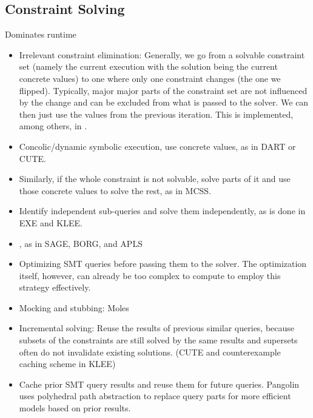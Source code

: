 \documentclass{article}
\begin{document}
\begin{multicols}{2}
    \subsection{Constraint Solving}
    \label{ConstraintSolving}
    Dominates runtime
    \begin{itemize}
        \item Irrelevant constraint elimination: Generally, we go from a solvable constraint set (namely the current execution with the solution being the current concrete values) to one where only one constraint changes (the one we flipped). Typically, major major parts of the constraint set are not influenced by the change and can be excluded from what is passed to the solver. We can then just use the values from the previous iteration. This is implemented, among others, in \cite{SAGE}.
        \item Concolic/dynamic symbolic execution, use concrete values, as in DART\cite{DART} or CUTE\cite{CUTE}.
        \item Similarly, if the whole constraint is not solvable, solve parts of it and use those concrete values to solve the rest, as in MCSS\cite{MCSS}.
        \item Identify independent sub-queries and solve them independently, as is done in EXE\cite{EXE} and KLEE\cite{KLEE}.
        \item {}\cite{Science}, as in SAGE\cite{SAGE}, BORG\cite{BORG}, and APLS\cite{APLS}
        \item Optimizing SMT queries before passing them to the solver. The optimization itself, however, can already be too complex to compute to employ this strategy effectively.
        \item Mocking and stubbing: Moles\cite{Moles}
        \item Incremental solving: Reuse the results of previous similar queries, because subsets of the constraints are still solved by the same results and supersets often do not invalidate existing solutions. (CUTE\cite{CUTE} and counterexample caching scheme in KLEE\cite{KLEE})
        \item Cache prior SMT query results and reuse them for future queries. Pangolin\cite{Pangolin} uses polyhedral path abstraction to replace query parts for more efficient models based on prior results.

\end{itemize}
\end{multicols}
\end{document}
